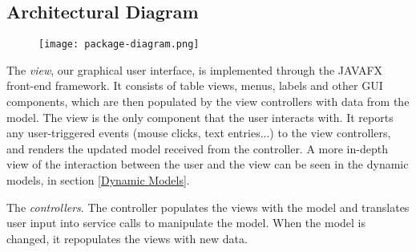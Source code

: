 \documentclass[12pt]{article}
\begin{document}


\subsection{Architectural Diagram}

\begin{figure}[H]
\texttt{[image: package-diagram.png]}
\end{figure}

The \textit{view}, our graphical user interface, is implemented through the JAVAFX front-end framework. It consists of table views, menus, labels and other GUI components, which are then populated by the view controllers with data from the model. The view is the only component that the user interacts with. It reports any user-triggered events (mouse clicks, text entries...) to the view controllers, and renders the updated model received from the controller. A more in-depth view of the interaction between the user and the view can be seen in the dynamic models, in section \ref{Dynamic Models}.

The \textit{controllers}. The controller populates the views with the model and translates user input into service calls to manipulate the model. When the model is changed, it repopulates the views with new data. 
\end{document}

